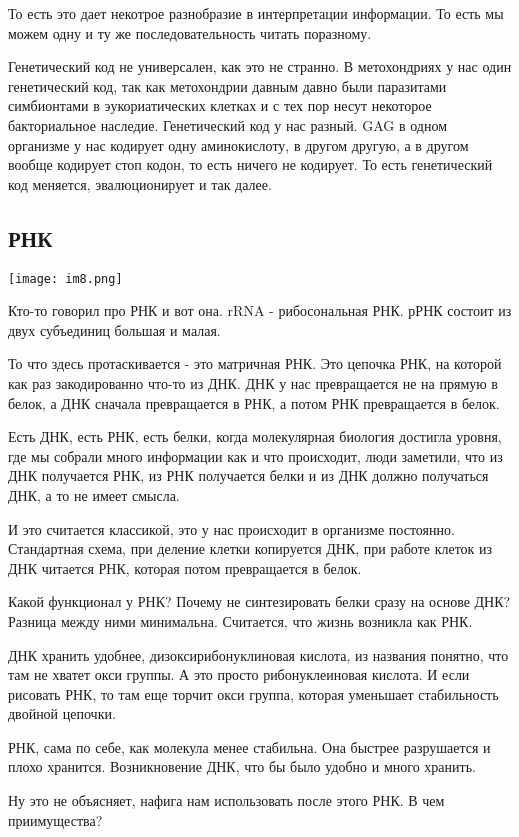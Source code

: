 То есть это дает некотрое разнобразие в интерпретации информации. 
То есть мы можем одну и ту же последовательность читать поразному. 

Генетический код не универсален, как это не странно. В метохондриях
у нас один генетический код, так как метохондрии давным давно были 
паразитами симбионтами в эукориатических клетках и с тех 
пор несут некоторое бакториальное наследие. Генетический код 
у нас разный. GAG в одном организме у нас кодирует 
одну аминокислоту, в другом другую, а в другом вообще кодирует 
стоп кодон, то есть ничего не кодирует. То есть 
генетический код меняется, эвалюционирует и 
так далее.


\subsection{РНК}
\texttt{[image: im8.png]}

Кто-то говорил про РНК и вот она. rRNA - рибосональная 
РНК. рРНК состоит из двух субъединиц большая и малая. 

То что здесь протаскивается - это матричная РНК. Это 
цепочка РНК, на которой как раз закодированно что-то из 
ДНК. ДНК у нас превращается не на прямую в белок, 
а ДНК сначала превращается в РНК, 
а потом РНК превращается в белок. 

Есть ДНК, есть РНК, есть белки, когда молекулярная 
биология достигла уровня, где мы собрали много информации 
как и что происходит, люди заметили, что из 
ДНК получается РНК, из РНК получается белки и из 
ДНК должно получаться ДНК, а то не имеет смысла. 

И это считается классикой, это у нас 
происходит в организме постоянно. Стандартная схема, 
при деление клетки копируется ДНК, при работе клеток 
из ДНК читается РНК, которая потом превращается в белок. 

Какой функционал у РНК? Почему не синтезировать 
белки сразу на основе ДНК? Разница между ними минимальна. 
Считается, что жизнь возникла как РНК. 

ДНК хранить удобнее, дизоксирибонуклиновая кислота, из 
названия понятно, что там не хватет окси группы. А это 
просто рибонуклеиновая кислота. И если рисовать РНК, то 
там еще торчит окси группа, которая уменьшает стабильность 
двойной цепочки. 

РНК, сама по себе, как молекула менее стабильна. Она быстрее 
разрушается и плохо хранится. Возникновение ДНК, что бы 
было удобно и много хранить. 

Ну это не объясняет, нафига нам использовать после этого РНК. В чем 
приимущества? 

